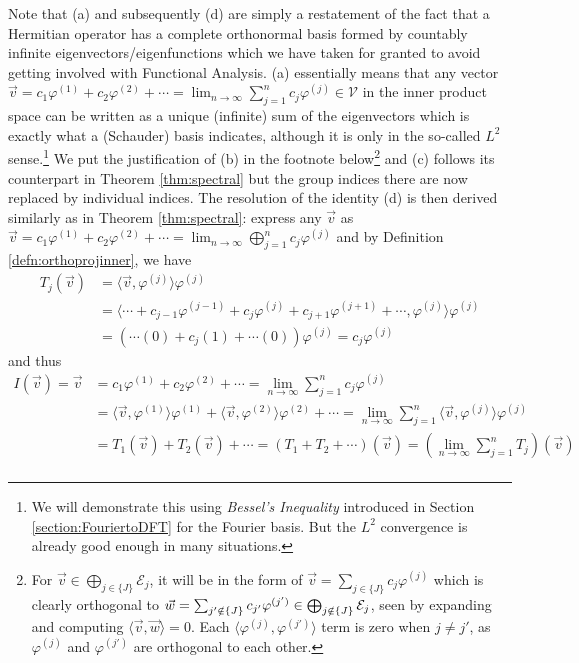 Note that (a) and subsequently (d) are simply a restatement of the fact that a Hermitian operator has a complete orthonormal basis formed by countably infinite eigenvectors/eigenfunctions which we have taken for granted to avoid getting involved with Functional Analysis. (a) essentially means that any vector $\vec{v} = c_1\varphi^{(1)} + c_2\varphi^{(2)} + \cdots = \lim_{n \to \infty}\sum_{j=1}^{n}c_j\varphi^{(j)} \in \mathcal{V}$ in the inner product space can be written as a unique (infinite) sum of the eigenvectors which is exactly what a (Schauder) basis indicates, although it is only in the so-called $L^2$ sense.\footnote{We will demonstrate this using \textit{Bessel's Inequality} introduced in Section \ref{section:FouriertoDFT} for the Fourier basis. But the $L^2$ convergence is already good enough in many situations.} We put the justification of (b) in the footnote below\footnote{For $\vec{v} \in \bigoplus_{j \in \{J\}} \mathcal{E}_{j}$, it will be in the form of $\vec{v} = \sum_{j \in \{J\}} c_j\varphi^{(j)}$ which is clearly orthogonal to $\vec{w} = \smash{\sum_{j' \notin \{J\}} c_{j'}\varphi^{(j')}} \in \bigoplus_{j \notin \{J\}} \mathcal{E}_{j}$, seen by expanding and computing $\langle \vec{v}, \vec{w} \rangle = 0$. Each $\langle \varphi^{(j)}, \varphi^{(j')} \rangle$ term is zero when $j \neq j'$, as $\varphi^{(j)}$ and $\varphi^{(j')}$ are orthogonal to each other.} and (c) follows its counterpart in Theorem \ref{thm:spectral} but the group indices there are now replaced by individual indices. The resolution of the identity (d) is then derived similarly as in Theorem \ref{thm:spectral}: express any $\vec{v}$ as $\vec{v} = c_1\varphi^{(1)} + c_2\varphi^{(2)} + \cdots = \lim_{n \to \infty} \bigoplus_{j=1}^{n} c_j\varphi^{(j)}$ and by Definition \ref{defn:orthoprojinner}, we have
\begin{align*}
T_j(\vec{v}) &= \langle \vec{v}, \varphi^{(j)} \rangle \varphi^{(j)} \\
&= \langle \cdots + c_{j-1}\varphi^{(j-1)} + c_j\varphi^{(j)} + c_{j+1}\varphi^{(j+1)} + \cdots, \varphi^{(j)} \rangle \varphi^{(j)} \\
&= (\cdots(0) + c_{j}(1) + \cdots(0))\varphi^{(j)} = c_j\varphi^{(j)}
\end{align*}
and thus
\begin{align*}
I(\vec{v}) = \vec{v} &= c_1\varphi^{(1)} + c_2\varphi^{(2)} + \cdots = \lim_{n \to \infty} \sum_{j=1}^{n} c_j\varphi^{(j)} \\
&= \langle \vec{v}, \varphi^{(1)} \rangle \varphi^{(1)} + \langle \vec{v}, \varphi^{(2)} \rangle \varphi^{(2)} + \cdots = \lim_{n \to \infty} \sum_{j=1}^{n} \langle \vec{v}, \varphi^{(j)} \rangle \varphi^{(j)} \\ 
&= T_1(\vec{v}) + T_2(\vec{v}) + \cdots = (T_1 + T_2 + \cdots)(\vec{v}) =  (\lim_{n \to \infty} \sum_{j=1}^{n} T_j)(\vec{v}) \\
\end{align*}
